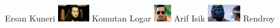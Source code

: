 \documentclass{exam}
\begin{document}
\begin{questions}
\begin{oneparchoices}
Ersan Kuneri
\choice \includegraphics[height=2em]{komutanlogar.jpeg}
Komutan Logar
\choice \includegraphics[height=2em]{arifisik.jpg}
Arif Isik
\choice \includegraphics[height=2em]{rendroy2.jpg}
Rendroy
\end{oneparchoices}
\end{questions}
\end{document}

